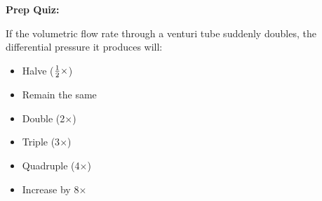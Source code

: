 \vfil \eject

\noindent
{\bf Prep Quiz:}

If the volumetric flow rate through a venturi tube suddenly doubles, the differential pressure it produces will:

\begin{itemize}
\item{} Halve (${1 \over 2} \times$) 
\vskip 5pt 
\item{} Remain the same
\vskip 5pt 
\item{} Double (2$\times$)
\vskip 5pt 
\item{} Triple (3$\times$)
\vskip 5pt 
\item{} Quadruple (4$\times$)
\vskip 5pt 
\item{} Increase by 8$\times$ 
\end{itemize}




